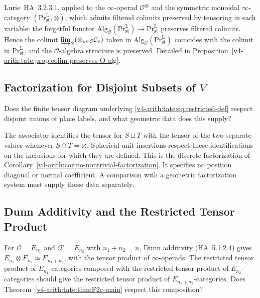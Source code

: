 \begin{correction}
Lurie~HA~3.2.3.1, applied to the \(\infty\)-operad
\(\mathcal{O}^{\otimes}\) and the symmetric monoidal
\(\infty\)-category \((\mathrm{Pr}^{\mathrm{L}}_{\mathrm{st}},\otimes)\),
which admits filtered colimits preserved by tensoring in each variable:
the forgetful functor
\(\mathrm{Alg}_{\mathcal{O}}(\mathrm{Pr}^{\mathrm{L}}_{\mathrm{st}})\to\mathrm{Pr}^{\mathrm{L}}_{\mathrm{st}}\)
preserves filtered colimits. Hence the colimit
\(\varinjlim_{S}(\otimes_{v\in S}\mathcal{C}_{v})\) taken in
\(\mathrm{Alg}_{\mathcal{O}}(\mathrm{Pr}^{\mathrm{L}}_{\mathrm{st}})\)
coincides with the colimit in \(\mathrm{Pr}^{\mathrm{L}}_{\mathrm{st}}\),
and the \(\mathcal{O}\)-algebra structure is preserved. Detailed in
Proposition~\ref{v4-arith:tate:prop:colim-preserves-O-alg}.
\end{correction}

\subsection{Factorization for Disjoint Subsets of \(V\)}

\begin{obstruction}
Does the finite tensor diagram underlying
\eqref{v4-arith:tate:eq:restricted-def} respect disjoint unions
of place labels, and what geometric data does this supply?
\end{obstruction}

\begin{correction}[discreteness of \(V\)]
The associator identifies the tensor for \(S\sqcup T\) with the
tensor of the two separate values whenever \(S\cap T=\varnothing\).
Spherical-unit insertions respect these identifications on the
inclusions for which they are defined. This is the discrete
factorization of Corollary~\ref{v4-arith:cor:no-nontrivial-factorization}.
It specifies no position diagonal or normal coefficient. A comparison
with a geometric factorization system must supply those data separately.
\end{correction}

\subsection{Dunn Additivity and the Restricted Tensor Product}

\begin{obstruction}
For \(\mathcal{O}=E_{n_{1}}\) and \(\mathcal{O}'=E_{n_{2}}\) with
\(n_{1}+n_{2}=n\), Dunn additivity (HA~5.1.2.4) gives
\(E_{n_{1}}\otimes E_{n_{2}}\simeq E_{n_{1}+n_{2}}\), with the tensor
product of \(\infty\)-operads. The
restricted tensor product of \(E_{n_{1}}\)-categories composed with
the restricted tensor product of \(E_{n_{2}}\)-categories should give
the restricted tensor product of \(E_{n_{1}+n_{2}}\)-categories. Does
Theorem~\ref{v4-arith:tate:thm:F2c-main} respect this composition?
\end{obstruction}

